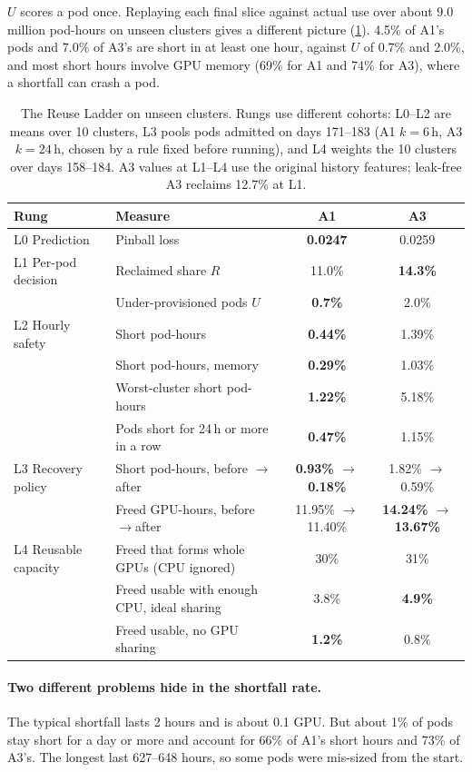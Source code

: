 \documentclass[10pt]{article}
\newcommand{\ra}{$\rightarrow$}
\newcommand{\finding}[1]{\paragraph{#1}}
\begin{document}
$U$ scores a pod once. Replaying each final slice against actual use over about 9.0 million pod-hours on unseen clusters gives a different picture (\cref{tab:ladder}). 4.5\% of A1's pods and 7.0\% of A3's are short in at least one hour, against $U$ of 0.7\% and 2.0\%, and most short hours involve GPU memory (69\% for A1 and 74\% for A3), where a shortfall can crash a pod.

\begin{table}[t]
\centering\small
\caption{The Reuse Ladder on unseen clusters. Rungs use different cohorts: L0--L2 are means over 10 clusters, L3 pools pods admitted on days 171--183 (A1 $k{=}6$\,h, A3 $k{=}24$\,h, chosen by a rule fixed before running), and L4 weights the 10 clusters over days 158--184. A3 values at L1--L4 use the original history features; leak-free A3 reclaims 12.7\% at L1.}
\label{tab:ladder}
\begin{tabular}{@{}llcc@{}}
\toprule
Rung & Measure & A1 & A3 \\
\midrule
L0 Prediction & Pinball loss & \textbf{0.0247} & 0.0259 \\
\midrule
L1 Per-pod decision & Reclaimed share $R$ & 11.0\% & \textbf{14.3\%} \\
& Under-provisioned pods $U$ & \textbf{0.7\%} & 2.0\% \\
\midrule
L2 Hourly safety & Short pod-hours & \textbf{0.44\%} & 1.39\% \\
& Short pod-hours, memory & \textbf{0.29\%} & 1.03\% \\
& Worst-cluster short pod-hours & \textbf{1.22\%} & 5.18\% \\
& Pods short for 24\,h or more in a row & \textbf{0.47\%} & 1.15\% \\
\midrule
L3 Recovery policy & Short pod-hours, before \ra after & \textbf{0.93\% \ra 0.18\%} & 1.82\% \ra 0.59\% \\
& Freed GPU-hours, before \ra after & 11.95\% \ra 11.40\% & \textbf{14.24\% \ra 13.67\%} \\
\midrule
L4 Reusable capacity & Freed that forms whole GPUs (CPU ignored) & 30\% & 31\% \\
& Freed usable with enough CPU, ideal sharing & 3.8\% & \textbf{4.9\%} \\
& Freed usable, no GPU sharing & \textbf{1.2\%} & 0.8\% \\
\bottomrule
\end{tabular}
\end{table}

\finding{Two different problems hide in the shortfall rate.} The typical shortfall lasts 2 hours and is about 0.1 GPU. But about 1\% of pods stay short for a day or more and account for 66\% of A1's short hours and 73\% of A3's. The longest last 627--648 hours, so some pods were mis-sized from the start.
\end{document}

